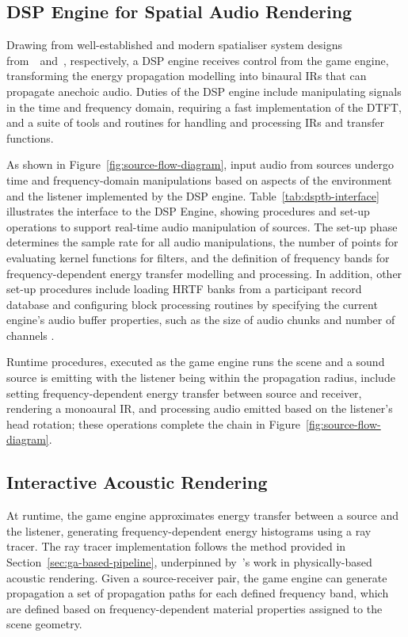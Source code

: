 \subsection{DSP Engine for Spatial Audio Rendering}
Drawing from well-established and modern spatialiser system designs from~\cite{naef2002spatialized}~and~\cite{lakka2021x3d}, respectively, a DSP engine receives control from the game engine, transforming the energy propagation modelling into binaural IRs that can propagate anechoic audio. Duties of the DSP engine include manipulating signals in the time and frequency domain, requiring a fast implementation of the DTFT, and a suite of tools and routines for handling and processing IRs and transfer functions.\par
As shown in Figure~\ref{fig:source-flow-diagram}, input audio from sources undergo time and frequency-domain manipulations based on aspects of the environment and the listener implemented by the DSP engine. Table~\ref{tab:dsptb-interface} illustrates the interface to the DSP Engine, showing procedures and set-up operations to support real-time audio manipulation of sources. The set-up phase determines the sample rate for all audio manipulations, the number of points for evaluating kernel functions for filters, and the definition of frequency bands for frequency-dependent energy transfer modelling and processing. In addition, other set-up procedures include loading HRTF banks from a participant record database and configuring block processing routines by specifying the current engine's audio buffer properties, such as the size of audio chunks and number of channels \citep{hoene2017mysofa}.\par
Runtime procedures, executed as the game engine runs the scene and a sound source is emitting with the listener being within the propagation radius, include setting frequency-dependent energy transfer between source and receiver, rendering a monoaural IR, and processing audio emitted based on the listener's head rotation; these operations complete the chain in Figure~\ref{fig:source-flow-diagram}.\par



\subsection{Interactive Acoustic Rendering}
At runtime, the game engine approximates energy transfer between a source and the listener, generating frequency-dependent energy histograms using a ray tracer. The ray tracer implementation follows the method provided in Section~\ref{sec:ga-based-pipeline}, underpinned by~\cite{schroder2011physically}'s work in physically-based acoustic rendering.
Given a source-receiver pair, the game engine can generate propagation a set of propagation paths for each defined frequency band, which are defined based on frequency-dependent material properties assigned to the scene geometry.\par

